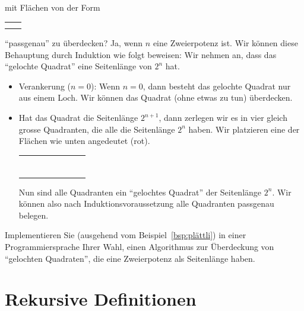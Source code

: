 \begin{bsp}
mit Flächen von der Form
\begin{tabular}{ c c }
&\cellcolor{black}\\
\cellcolor{black}&\cellcolor{black}
\end{tabular}
``passgenau'' zu überdecken? Ja, wenn $n$ eine Zweierpotenz ist. Wir können diese Behauptung durch Induktion wie folgt beweisen:  Wir nehmen an, dass das ``gelochte Quadrat'' eine Seitenlänge von $2^n$ hat.
\begin{itemize}
\item Verankerung ($n=0$): Wenn $n=0$, dann besteht das gelochte Quadrat nur aus einem Loch. Wir können das Quadrat (ohne etwas zu tun) überdecken.
\item Hat das Quadrat die Seitenlänge $2^{n+1}$, dann zerlegen wir es in vier gleich grosse Quadranten, die alle die Seitenlänge $2^n$ haben. Wir platzieren eine der Flächen wie unten angedeutet (rot).
\begin{center}
\begin{tabular}{ | c | c | c | c !{\color{red}\vrule} c  | c | c | c | }
\hline
&&&&&&&\\
\hline
&&&&&&&\\
\hline
&&&&&&&\\
\hline
&&&&&&&\\
\hline
{}&&&&&&&\\
\hline
&&&&&&&\\
\hline
&&&&&&&\\
\hline
&&&&&&&\\
\hline
\end{tabular}
\end{center}
Nun sind alle Quadranten ein ``gelochtes Quadrat'' der Seitenlänge $2^n$. Wir können also nach Induktionsvoraussetzung alle Quadranten passgenau belegen.
\end{itemize}
\end{bsp}

\begin{ueb}
Implementieren Sie (ausgehend vom Beispiel~\ref{bsp:plättli}) in einer Programmiersprache Ihrer Wahl, einen Algorithmus zur Überdeckung von ``gelochten Quadraten'', die eine Zweierpotenz als Seitenlänge haben.
\end{ueb}

\section{Rekursive Definitionen}

